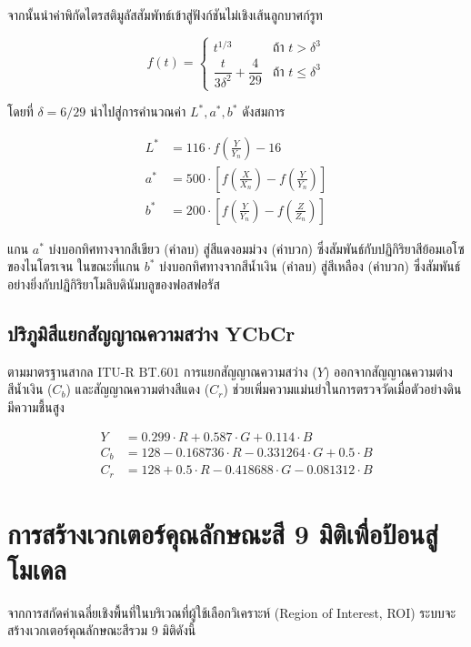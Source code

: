 จากนั้นนำค่าพิกัดไตรสติมูลัสสัมพัทธ์เข้าสู่ฟังก์ชันไม่เชิงเส้นลูกบาศก์รูท

\begin{equation}
f(t) = \begin{cases}
t^{1/3} & \text{ถ้า } t > \delta^3 \\[6pt]
\dfrac{t}{3 \delta^2} + \dfrac{4}{29} & \text{ถ้า } t \le \delta^3
\end{cases}
\end{equation}

โดยที่ $\delta = 6/29$ นำไปสู่การคำนวณค่า $L^*, a^*, b^*$ ดังสมการ

\begin{align}
L^* &= 116 \cdot f\left( \frac{Y}{Y_n} \right) - 16 \\
a^* &= 500 \cdot \left[ f\left( \frac{X}{X_n} \right) - f\left( \frac{Y}{Y_n} \right) \right] \\
b^* &= 200 \cdot \left[ f\left( \frac{Y}{Y_n} \right) - f\left( \frac{Z}{Z_n} \right) \right]
\end{align}

แกน $a^*$ บ่งบอกทิศทางจากสีเขียว (ค่าลบ) สู่สีแดงอมม่วง (ค่าบวก) ซึ่งสัมพันธ์กับปฏิกิริยาสีย้อมเอโซของไนโตรเจน ในขณะที่แกน $b^*$ บ่งบอกทิศทางจากสีน้ำเงิน (ค่าลบ) สู่สีเหลือง (ค่าบวก) ซึ่งสัมพันธ์อย่างยิ่งกับปฏิกิริยาโมลิบดินัมบลูของฟอสฟอรัส

\subsection{ปริภูมิสีแยกสัญญาณความสว่าง YCbCr}
ตามมาตรฐานสากล $\text{ITU-R BT.601}$ การแยกสัญญาณความสว่าง ($Y$) ออกจากสัญญาณความต่างสีน้ำเงิน ($C_b$) และสัญญาณความต่างสีแดง ($C_r$) ช่วยเพิ่มความแม่นยำในการตรวจวัดเมื่อตัวอย่างดินมีความชื้นสูง

\begin{align}
Y &= 0.299 \cdot R + 0.587 \cdot G + 0.114 \cdot B \\
C_b &= 128 - 0.168736 \cdot R - 0.331264 \cdot G + 0.5 \cdot B \\
C_r &= 128 + 0.5 \cdot R - 0.418688 \cdot G - 0.081312 \cdot B
\end{align}

\section{การสร้างเวกเตอร์คุณลักษณะสี 9 มิติเพื่อป้อนสู่โมเดล}

จากการสกัดค่าเฉลี่ยเชิงพื้นที่ในบริเวณที่ผู้ใช้เลือกวิเคราะห์ (Region of Interest, ROI) ระบบจะสร้างเวกเตอร์คุณลักษณะสีรวม 9 มิติดังนี้

